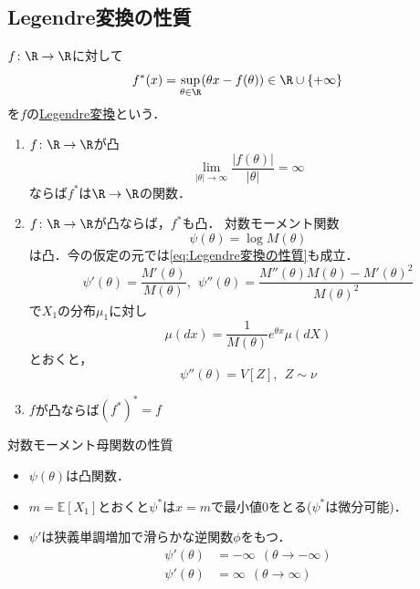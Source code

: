 \subsection{Legendre変換の性質}
    $f\colon \R\to \R$に対して
\begin{equation}
    f^*(x)= \sup_{\theta\in \R} (\theta x- f(\theta))\in \R\cup \{+\infty\}
\end{equation}
    を$f$の\underline{Legendre変換}という．
\begin{enumerate}
    \item $f\colon \R\to \R$が凸
\begin{equation} \label{eq:Legendre変換の性質}
    \lim_{|\theta|\to \infty} \frac{|f(\theta)|}{|\theta|}= \infty
\end{equation}
    ならば$f^*$は$\R\to \R$の関数．
    \item $f\colon \R\to \R$が凸ならば，$f^*$も凸．
    対数モーメント関数
\begin{equation}
    \psi(\theta)= \log{M(\theta)}
\end{equation}
    は凸．今の仮定の元では\eqref{eq:Legendre変換の性質}も成立．
\begin{equation}
    \psi'(\theta)= \frac{M'(\theta)}{M(\theta)},\ \ \psi''(\theta)= \frac{M''(\theta)M(\theta)- M'(\theta)^2}{M(\theta)^2}
\end{equation}
    で$X_1$の分布$\mu_1$に対し  
\begin{equation}
    \mu(dx)= \frac{1}{M(\theta)}e^{\theta x}\mu(dX)
\end{equation}
    とおくと，
\begin{equation}
    \psi''(\theta)= V[Z],\ \ Z\sim \nu
\end{equation}
    \item $f$が凸ならば$(f^*)^*= f$
\end{enumerate}
    対数モーメント母関数の性質
\begin{itemize}
    \item $\psi(\theta)$は凸関数．
    \item $m= \mathbb{E}[X_1]$とおくと$\psi^*$は$x= m$で最小値0をとる($\psi^*$は微分可能)．
    \item $\psi'$は狭義単調増加で滑らかな逆関数$\phi$をもつ．
\begin{align}
    \psi'(\theta)&= -\infty\ \ (\theta\to -\infty)\\
    \psi'(\theta)&= \infty\ \ (\theta\to \infty)
\end{align}
\end{itemize}

